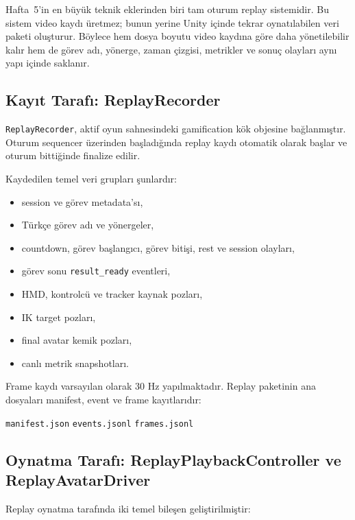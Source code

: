 \documentclass[11pt,a4paper]{article}
\begin{document}
Hafta~5'in en büyük teknik eklerinden biri tam oturum replay sistemidir. Bu
sistem video kaydı üretmez; bunun yerine Unity içinde tekrar oynatılabilen
veri paketi oluşturur. Böylece hem dosya boyutu video kaydına göre daha
yönetilebilir kalır hem de görev adı, yönerge, zaman çizgisi, metrikler ve
sonuç olayları aynı yapı içinde saklanır.

\subsection{Kayıt Tarafı: ReplayRecorder}

\texttt{ReplayRecorder}, aktif oyun sahnesindeki gamification kök objesine
bağlanmıştır. Oturum sequencer üzerinden başladığında replay kaydı otomatik
olarak başlar ve oturum bittiğinde finalize edilir.

Kaydedilen temel veri grupları şunlardır:

\begin{itemize}[nosep]
    \item session ve görev metadata'sı,
    \item Türkçe görev adı ve yönergeler,
    \item countdown, görev başlangıcı, görev bitişi, rest ve session olayları,
    \item görev sonu \texttt{result\_ready} eventleri,
    \item HMD, kontrolcü ve tracker kaynak pozları,
    \item IK target pozları,
    \item final avatar kemik pozları,
    \item canlı metrik snapshotları.
\end{itemize}

Frame kaydı varsayılan olarak 30 Hz yapılmaktadır. Replay paketinin ana
dosyaları manifest, event ve frame kayıtlarıdır:
\begin{center}
\texttt{manifest.json} \quad \texttt{events.jsonl} \quad \texttt{frames.jsonl}
\end{center}

\subsection{Oynatma Tarafı: ReplayPlaybackController ve ReplayAvatarDriver}

Replay oynatma tarafında iki temel bileşen geliştirilmiştir:
\end{document}
